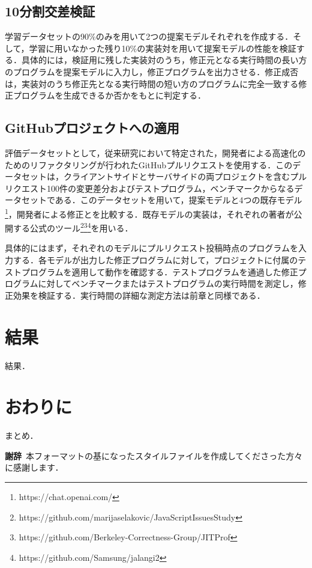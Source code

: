 \documentclass[T,J]{fose} %
\begin{document}
\subsection{10分割交差検証}
学習データセットの90\%のみを用いて2つの提案モデルそれぞれを作成する．そして，学習に用いなかった残り10\%の実装対を用いて提案モデルの性能を検証する．具体的には，検証用に残した実装対のうち，修正元となる実行時間の長い方のプログラムを提案モデルに入力し，修正プログラムを出力させる．修正成否は，実装対のうち修正先となる実行時間の短い方のプログラムに完全一致する修正プログラムを生成できるか否かをもとに判定する．

\subsection{GitHubプロジェクトへの適用}
評価データセットとして，従来研究において特定された，開発者による高速化のためのリファクタリングが行われたGitHubプルリクエストを使用する．このデータセットは，クライアントサイドとサーバサイドの両プロジェクトを含むプルリクエスト100件の変更差分およびテストプログラム，ベンチマークからなるデータセットである．このデータセットを用いて，提案モデルと4つの既存モデル\cite{Selakovic_2016}\cite{Gong_2015}\cite{Selakovic_2017}\footnote{https://chat.openai.com/}，開発者による修正とを比較する．既存モデルの実装は，それぞれの著者が公開する公式のツール\footnote{https://github.com/marijaselakovic/JavaScriptIssuesStudy}\footnote{https://github.com/Berkeley-Correctness-Group/JITProf}\footnote{https://github.com/Samsung/jalangi2}を用いる．

具体的にはまず，それぞれのモデルにプルリクエスト投稿時点のプログラムを入力する．各モデルが出力した修正プログラムに対して，プロジェクトに付属のテストプログラムを適用して動作を確認する．テストプログラムを通過した修正プログラムに対してベンチマークまたはテストプログラムの実行時間を測定し，修正効果を検証する．実行時間の詳細な測定方法は前章と同様である．

\section{結果}
結果．


\section{おわりに}
まとめ．


\textbf{謝辞}\
本フォーマットの基になったスタイルファイルを作成してくださった方々に感謝します．




\end{document}
